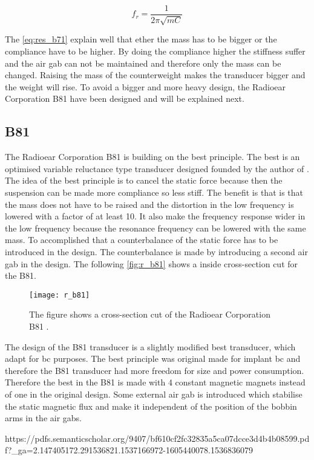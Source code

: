 \begin{equation}\label{eq:res_b71}
f_r=\frac{1}{2 \pi \sqrt{m C}}
\end{equation}

    \startexplain
    \stopexplain

The \autoref{eq:res_b71} explain well that ether the mass has to be bigger or the compliance have to be higher. By doing the compliance higher the stiffness suffer and the air gab can not be maintained and therefore only the mass can be changed. Raising the mass of the counterweight makes the transducer bigger and the weight will rise. To avoid a bigger and more heavy design, the Radioear Corporation B81 have been designed and will be explained next. 


\subsection{B81}
The Radioear Corporation B81 is building on the \gls{best} principle. The \gls{best} is an optimised variable reluctance type transducer designed founded by the author of \citep{the_balanced_2003}. The idea of the \gls{best} principle is to cancel the static force because then the suspension can be made more compliance so less stiff. The benefit is that is that the mass does not have to be raised and the distortion in the low frequency is lowered with a factor of at least 10. It also make the frequency response wider in the low frequency because the resonance frequency can be lowered with the same mass. To accomplished that a counterbalance of the static force has to be introduced in the design. The counterbalance is made by introducing a second air gab in the design. The following \autoref{fig:r_b81} shows a inside cross-section cut for the B81.

 \begin{figure}[H]
	\centering
		\texttt{[image: r\_b81]}
		\caption{The figure shows a cross-section cut of the Radioear Corporation B81  \citep{the_balanced_2003}.}
		\label{fig:r_b81}
\end{figure}

The design of the B81 transducer is a slightly modified \gls{best} transducer, which adapt for \gls{bc} purposes. The \gls{best} principle was original made for implant \gls{bc} and therefore the B81 transducer had more freedom for size and power consumption. Therefore the \gls{best} in the B81 is made with 4 constant magnetic magnets instead of one in the original design. Some external air gab is introduced which stabilise the static magnetic flux and make it independent of the position of the bobbin arms in the air gabs. 


https://pdfs.semanticscholar.org/9407/bf610cf2fc32835a5ca07dcce3d4b4b08599.pdf?_ga=2.147405172.291536821.1537166972-1605440078.1536836079